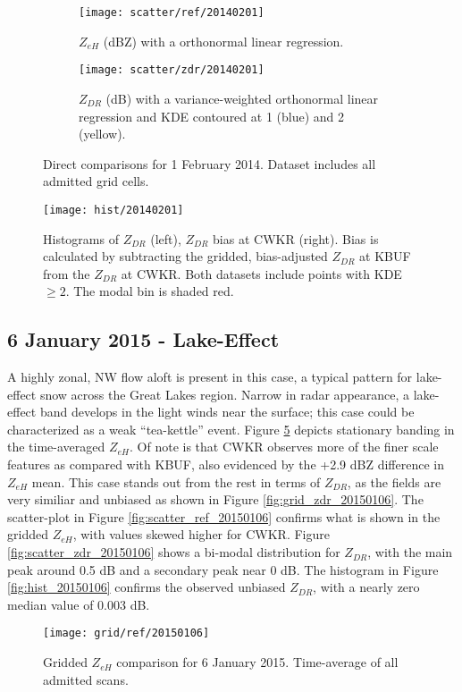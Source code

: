 \begin{figure}[H]
\centering
   \begin{subfigure}[t]{0.48\linewidth} \centering
     \texttt{[image: scatter/ref/20140201]}
     \caption{$Z_{eH}$ (dBZ) with a orthonormal linear regression.}\label{fig:scatter_ref_20140201}
   \end{subfigure}
   \begin{subfigure}[t]{0.48\linewidth} \centering
     \texttt{[image: scatter/zdr/20140201]}
     \caption{$Z_{DR}$ (dB) with a variance-weighted orthonormal linear regression and KDE contoured at 1 (blue) and 2 (yellow).}\label{fig:scatter_zdr_20140201}
   \end{subfigure}
\caption{Direct comparisons for 1 February 2014. Dataset includes all admitted grid cells.} \label{fig:scatter_20140201}
\end{figure}

\begin{figure}[H]
\texttt{[image: hist/20140201]}\centering
\caption{Histograms of $Z_{DR}$ (left), $Z_{DR}$ bias at CWKR (right). Bias is calculated by subtracting the gridded, bias-adjusted $Z_{DR}$ at KBUF from the
$Z_{DR}$ at CWKR. Both datasets include points with KDE $\geq 2$. The modal bin is shaded red.} 
\label{fig:hist_20140201}
\end{figure}

\subsection{6 January 2015 - Lake-Effect}
A highly zonal, NW flow aloft is present in this case, a typical pattern for lake-effect snow across the Great Lakes region. Narrow in radar appearance, a
lake-effect band develops in the light winds near the surface; this case could be characterized as a weak ``tea-kettle'' event. Figure
\ref{fig:grid_ref_20150106} depicts stationary banding in the time-averaged $Z_{eH}$. Of note is that CWKR observes more of the finer scale features as
compared with KBUF, also evidenced by the +2.9 dBZ difference in $Z_{eH}$ mean. 
This case stands out from the rest in terms of $Z_{DR}$, as the fields are
very similiar and unbiased as shown in Figure \ref{fig:grid_zdr_20150106}. The scatter-plot in Figure
\ref{fig:scatter_ref_20150106} confirms what is shown in the gridded $Z_{eH}$, with values skewed higher for CWKR. Figure \ref{fig:scatter_zdr_20150106}
shows a bi-modal distribution for $Z_{DR}$, with the
main peak around 0.5 dB and a secondary peak near 0 dB. The histogram in Figure
\ref{fig:hist_20150106} confirms the observed unbiased $Z_{DR}$, with a nearly zero median value of 0.003 dB.
\begin{figure}[H]
\texttt{[image: grid/ref/20150106]}
\caption{Gridded $Z_{eH}$ comparison for 6 January 2015. Time-average of all admitted scans.} 
\label{fig:grid_ref_20150106}
\end{figure}

